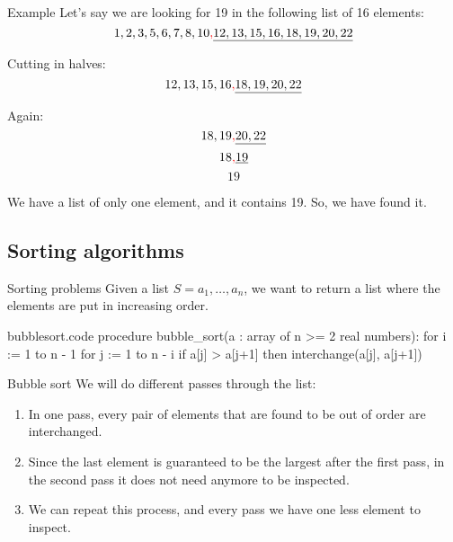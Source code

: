 \documentclass[a4paper]{article}
\begin{document}
\begin{parag}{Example}
    Let's say we are looking for 19 in the following list of 16 elements:
    \[1, 2, 3, 5, 6, 7, 8, 10{\color{red},} \underline{12, 13, 15, 16, 18, 19, 20, 22}\]

    Cutting in halves:
    \[12, 13, 15, 16{\color{red},} \underline{18, 19, 20, 22}\]

    Again:
    \[18, 19{\color{red},} \underline{20, 22}\]
    \[18{\color{red},} \underline{19}\]
    \[19\]

    We have a list of only one element, and it contains 19. So, we have found it.
\end{parag}

\subsection{Sorting algorithms}
\begin{parag}{Sorting problems}
    Given a list $S = a_1, \ldots, a_n$, we want to return a list where the elements are put in increasing order.
\end{parag}

\begin{filecontents*}[overwrite]{bubblesort.code}
procedure bubble_sort(a : array of n >= 2 real numbers):
    for i := 1 to n - 1
        for j := 1 to n - i
            if a[j] > a[j+1] then interchange(a[j], a[j+1])  
\end{filecontents*}


\begin{parag}{Bubble sort}
    We will do different passes through the list:
    \begin{enumerate}
        \item In one pass, every pair of elements that are found to be out of order are interchanged.
        \item Since the last element is guaranteed to be the largest after the first pass, in the second pass it does not need anymore to be inspected.
        \item We can repeat this process, and every pass we have one less element to inspect.
    \end{enumerate}

    
\end{parag}
\end{document}
